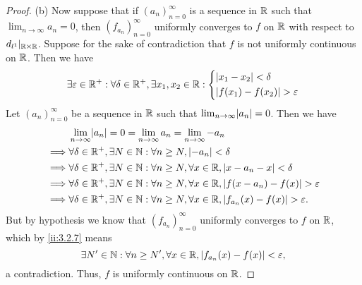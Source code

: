 \begin{proof}{(b)}
  Now suppose that if \((a_n)_{n = 0}^\infty\) is a sequence in \(\mathbb{R}\) such that \(\lim_{n \to \infty} a_n = 0\), then \((f_{a_n})_{n = 0}^\infty\) uniformly converges to \(f\) on \(\mathbb{R}\) with respect to \(d_{l^1}|_{\mathbb{R} \times \mathbb{R}}\).
  Suppose for the sake of contradiction that \(f\) is not uniformly continuous on \(\mathbb{R}\).
  Then we have
  \[
    \exists \varepsilon \in \mathbb{R}^+ : \forall \delta \in \mathbb{R}^+, \exists x_1, x_2 \in \mathbb{R} : \begin{dcases}
      \left\lvert x_1 - x_2\right\rvert < \delta \\
      \left\lvert f(x_1) - f(x_2)\right\rvert > \varepsilon
    \end{dcases}
  \]
  Let \((a_n)_{n = 0}^\infty\) be a sequence in \(\mathbb{R}\) such that \(\lim_{n \to \infty} \abs{a_n} = 0\).
  Then we have
  \begin{align*}
             & \lim_{n \to \infty} \abs{a_n} = 0 = \lim_{n \to \infty} a_n = \lim_{n \to \infty} -a_n                                 \\
    \implies & \forall \delta \in \R^+, \exists N \in \N : \forall n \geq N, \abs{-a_n} < \delta                                      \\
    \implies & \forall \delta \in \R^+, \exists N \in \N : \forall n \geq N, \forall x \in \R, \abs{x - a_n - x} < \delta             \\
    \implies & \forall \delta \in \R^+, \exists N \in \N : \forall n \geq N, \forall x \in \R, \abs{f(x - a_n) - f(x)} > \varepsilon  \\
    \implies & \forall \delta \in \R^+, \exists N \in \N : \forall n \geq N, \forall x \in \R, \abs{f_{a_n}(x) - f(x)} > \varepsilon.
  \end{align*}
  But by hypothesis we know that \((f_{a_n})_{n = 0}^\infty\) uniformly converges to \(f\) on \(\mathbb{R}\), which by \cref{ii:3.2.7} means
  \[
    \exists N' \in \mathbb{N} : \forall n \geq N', \forall x \in \mathbb{R}, \left\lvert f_{a_n}(x) - f(x)\right\rvert < \varepsilon,
  \]
  a contradiction.
  Thus, \(f\) is uniformly continuous on \(\mathbb{R}\).
\end{proof}

